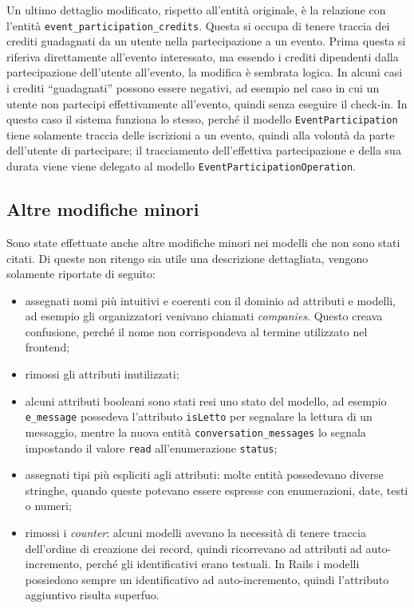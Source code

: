 Un ultimo dettaglio modificato, rispetto all'entità originale, è la relazione con l'entità \verb|event_participation_credits|. Questa si occupa di tenere traccia dei crediti guadagnati da un utente nella partecipazione a un evento. Prima questa si riferiva direttamente all'evento interessato, ma essendo i crediti dipendenti dalla partecipazione dell'utente all'evento, la modifica è sembrata logica. In alcuni casi i crediti ``guadagnati'' possono essere negativi, ad esempio nel caso in cui un utente non partecipi effettivamente all'evento, quindi senza eseguire il check-in. In questo caso il sistema funziona lo stesso, perché il modello \verb|EventParticipation| tiene solamente traccia delle iscrizioni a un evento, quindi alla volontà da parte dell'utente di partecipare; il tracciamento dell'effettiva partecipazione e della sua durata viene viene delegato al modello \verb|EventParticipationOperation|.


\subsection{Altre modifiche minori}
Sono state effettuate anche altre modifiche minori nei modelli che non sono stati citati. Di queste non ritengo sia utile una descrizione dettagliata, vengono solamente riportate di seguito:
\begin{itemize}
	\item assegnati nomi più intuitivi e coerenti con il dominio ad attributi e modelli, ad esempio gli organizzatori venivano chiamati \emph{companies}. Questo creava confusione, perché il nome non corrispondeva al termine utilizzato nel frontend;
	\item rimossi gli attributi inutilizzati;
	\item alcuni attributi booleani sono stati resi uno stato del modello, ad esempio \verb|e_message| possedeva l'attributo \verb|isLetto| per segnalare la lettura di un messaggio, mentre la nuova entità \verb|conversation_messages| lo segnala impostando il valore \verb|read| all'enumerazione \verb|status|;
	\item assegnati tipi più espliciti agli attributi: molte entità possedevano diverse stringhe, quando queste potevano essere espresse con enumerazioni, date, testi o numeri;
	\item rimossi i \emph{counter}: alcuni modelli avevano la necessità di tenere traccia dell'ordine di creazione dei record, quindi ricorrevano ad attributi ad auto-incremento, perché gli identificativi erano testuali. In Rails i modelli possiedono sempre un identificativo ad auto-incremento, quindi l'attributo aggiuntivo risulta superfuo.
\end{itemize}
